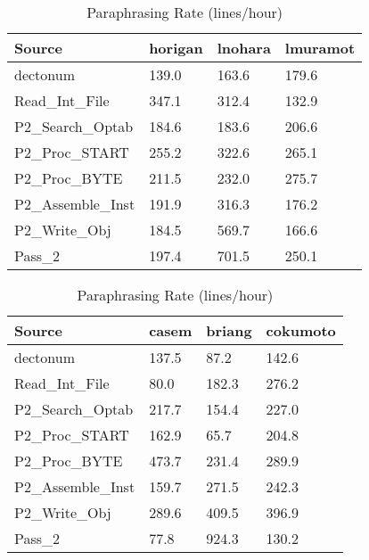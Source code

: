 \begin{table}[hb]
\begin{center}
\begin{tabular}{|l|l|l|l|}
\hline
Source & horigan & lnohara & lmuramot\\
\hline
dectonum & 139.0 & 163.6 & 179.6\\
Read\_Int\_File & 347.1 & 312.4 & 132.9\\
P2\_Search\_Optab & 184.6 & 183.6 & 206.6\\
P2\_Proc\_START & 255.2 & 322.6 & 265.1\\
P2\_Proc\_BYTE & 211.5 & 232.0 & 275.7\\
P2\_Assemble\_Inst & 191.9 & 316.3 & 176.2\\
P2\_Write\_Obj & 184.5 & 569.7 & 166.6\\
Pass\_2 & 197.4 & 701.5 & 250.1\\
\hline
\end{tabular}
\end{center}
\caption{Paraphrasing Rate (lines/hour)}
\end{table}

\begin{table}[hb]
\begin{center}
\begin{tabular}{|l|l|l|l|}
\hline
Source & casem & briang & cokumoto\\
\hline
dectonum & 137.5 & 87.2 & 142.6\\
Read\_Int\_File & 80.0 & 182.3 & 276.2\\
P2\_Search\_Optab & 217.7 & 154.4 & 227.0\\
P2\_Proc\_START & 162.9 & 65.7 & 204.8\\
P2\_Proc\_BYTE & 473.7 & 231.4 & 289.9\\
P2\_Assemble\_Inst & 159.7 & 271.5 & 242.3\\
P2\_Write\_Obj & 289.6 & 409.5 & 396.9\\
Pass\_2 & 77.8 & 924.3 & 130.2\\
\hline
\end{tabular}
\end{center}
\caption{Paraphrasing Rate (lines/hour)}
\end{table}

